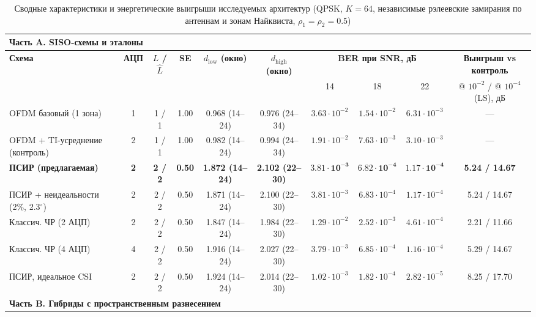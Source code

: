 \documentclass[a4paper,12pt]{article}
\numberwithin{equation}{section}
\begin{document}
\begin{table}[htbp]
\centering
\footnotesize
\caption{Сводные характеристики и энергетические выигрыши исследуемых архитектур (QPSK, $K{=}64$, независимые рэлеевские замирания по антеннам и зонам Найквиста, $\rho_1{=}\rho_2{=}0.5$)}


\label{tab:results}
\begin{adjustbox}{max width=\textwidth}
\begin{tabular}{@{}lccccccccc@{}}
\toprule
\multicolumn{10}{l}{\textbf{Часть A. SISO-схемы и эталоны}} \\
\midrule
\textbf{Схема} & \textbf{АЦП} & \textbf{$L$ / $\hat{L}$} & \textbf{SE} & \textbf{$d_{\text{low}}$ (окно)} & \textbf{$d_{\text{high}}$ (окно)} & \multicolumn{3}{c}{\textbf{BER при SNR, дБ}} & \textbf{Выигрыш vs контроль} \\
\cmidrule(lr){7-9}
 & & & & & & 14 & 18 & 22 & @ $10^{-2}$ / @ $10^{-4}$ (LS), дБ \\
\midrule
OFDM базовый (1 зона) & 1 & 1 / 1 & 1.00 & 0.968 (14--24) & 0.976 (24--34) & $3.63{\cdot}10^{-2}$ & $1.54{\cdot}10^{-2}$ & $6.31{\cdot}10^{-3}$ & --- \\
OFDM + TI-усреднение (контроль) & 2 & 1 / 1 & 1.00 & 0.982 (14--24) & 0.994 (24--34) & $1.91{\cdot}10^{-2}$ & $7.63{\cdot}10^{-3}$ & $3.10{\cdot}10^{-3}$ & --- \\
\textbf{ПСИР (предлагаемая)} & \textbf{2} & \textbf{2 / 2} & \textbf{0.50} & \textbf{1.872 (14--24)} & \textbf{2.102 (22--30)} & $\mathbf{3.81{\cdot}10^{-3}}$ & $\mathbf{6.82{\cdot}10^{-4}}$ & $\mathbf{1.17{\cdot}10^{-4}}$ & \textbf{5.24 / 14.67} \\
ПСИР + неидеальности (2\%, 2.3$^\circ$) & 2 & 2 / 2 & 0.50 & 1.871 (14--24) & 2.100 (22--30) & $3.81{\cdot}10^{-3}$ & $6.83{\cdot}10^{-4}$ & $1.17{\cdot}10^{-4}$ & 5.24 / 14.67 \\
Классич. ЧР (2 АЦП) & 2 & 2 / 2 & 0.50 & 1.847 (14--24) & 1.984 (22--30) & $1.29{\cdot}10^{-2}$ & $2.52{\cdot}10^{-3}$ & $4.61{\cdot}10^{-4}$ & 2.21 / 11.66 \\
Классич. ЧР (4 АЦП) & 4 & 2 / 2 & 0.50 & 1.916 (14--24) & 2.027 (22--30) & $3.79{\cdot}10^{-3}$ & $6.85{\cdot}10^{-4}$ & $1.16{\cdot}10^{-4}$ & 5.29 / 14.67 \\
ПСИР, идеальное CSI & 2 & 2 / 2 & 0.50 & 1.924 (14--24) & 2.014 (22--30) & $1.02{\cdot}10^{-3}$ & $1.82{\cdot}10^{-4}$ & $2.82{\cdot}10^{-5}$ & 8.25 / 17.70 \\
\midrule
\multicolumn{10}{l}{\textbf{Часть B. Гибриды с пространственным разнесением}} \\

\end{tabular}
\end{adjustbox}
\end{table}
\end{document}
